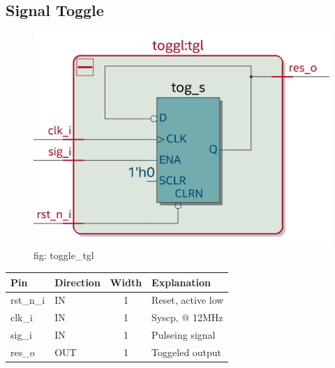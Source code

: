 \documentclass[12pt,a4 paper] {article}
\begin{document}
\subsection{Signal Toggle}
\begin{figure}[h]
	\centering	
	\includegraphics[scale=0.2]{../png/toggl_tgl.png}
	\newline
	fig: toggle\_tgl \\
\end{figure}
\begin{center}
	\begin{tabular}{| p{2cm} | p{2cm} | c| p{4cm} |}
	\hline
	Pin & Direction & Width & Explanation\\
	\hline	
	  rst\_n\_i & IN  & 1 &  Reset, active low\\
	  \hline
	clk\_i & IN  & 1 & Syscp, @ 12MHz \\
	\hline
	sig\_i & IN   & 1 &  Pulseing signal\\
	\hline
	res\_o  & OUT   & 1 & Toggeled output\\
	\hline
	\end{tabular}
\end{center}
\newpage
\end{document}
